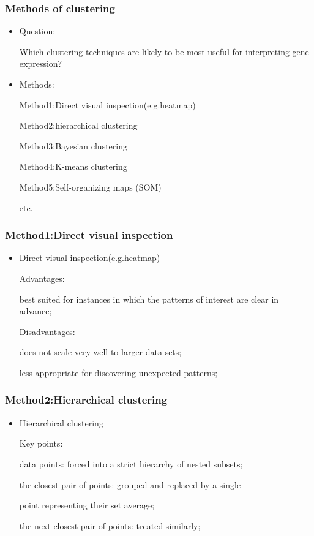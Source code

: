 \begin{frame}
    \frametitle{Methods of clustering}
    \begin{itemize}
      \item Question:
   
    Which clustering techniques are likely to be most useful for interpreting gene expression?

      \item Methods:
    
    Method1:Direct visual inspection(e.g.heatmap)

    Method2:hierarchical clustering
    
    Method3:Bayesian clustering
         
    Method4:K-means clustering
         
    Method5:Self-organizing maps (SOM)

    etc.
    \end{itemize}
\end{frame}

\begin{frame}
    \frametitle{Method1:Direct visual inspection}
    \begin{itemize}
      \item Direct visual inspection(e.g.heatmap)

          Advantages: 

              best suited for instances in which the patterns of interest are clear in advance;

          Disadvantages:

              does not scale very well to larger data sets;

              less appropriate for discovering unexpected patterns;
    \end{itemize}
\end{frame}

\begin{frame}
    \frametitle{Method2:Hierarchical clustering}
    \begin{itemize}
      \item Hierarchical clustering

    Key points:

    data points: forced into a strict hierarchy of nested subsets;

    the closest pair of points: grouped and replaced by a single
    
    point representing their set average;

    the next closest pair of points: treated similarly;
    \end{itemize}
    
\end{frame}

